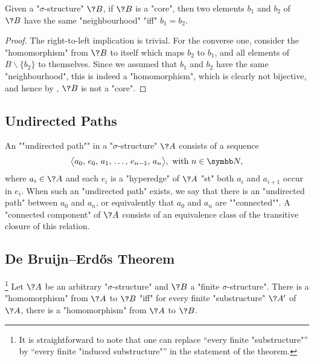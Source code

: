 \begin{proposition}
	\AP\label{prop:neighbourhood-core}
	Given a "$\sigma$-structure" $\?B$, if $\?B$ is a "core", then
	two elements $b_1$ and $b_2$ of $\?B$ have the same "neighbourhood" "iff" $b_1 = b_2$.
\end{proposition}

\begin{proof}
	The right-to-left implication is trivial.
	For the converse one, consider the "homomorphism" from $\?B$ to itself
	which maps $b_2$ to $b_1$, and all elements of $B \smallsetminus \{b_2\}$
	to themselves. Since we assumed that $b_1$ and $b_2$ have the same "neighbourhood",
	this is indeed a "homomorphism", which is clearly not bijective, and
	hence by , $\?B$ is not a "core".
\end{proof}

\subsection{Undirected Paths}

An \AP""undirected path"" in a "$\sigma$-structure" $\?A$ consists of a sequence
\[\big\langle a_0,\, e_0,\, a_1,\, \hdots,\, e_{n-1},\, a_n\big\rangle, \text{ with } n \in \N,\]
where $a_i \in \?A$ and each $e_i$ is a "hyperedge" of $\?A$ "st" both
$a_i$ and $a_{i+1}$ occur in $e_i$. When such an "undirected path" exists, we say that
there is an "undirected path" between $a_0$ and $a_n$, or equivalently
that $a_0$ and $a_n$ are \AP""connected"". A \AP"connected component" of $\?A$ consists of an equivalence class of the 
transitive closure of this relation.

\subsection{De Bruijn–Erdős Theorem}

\AP\begin{proposition}
	\!\footnote{It is straightforward to note that
	one can replace ``every finite "substructure"'' by
	``every finite "induced substructure"'' in the statement of the theorem.}%
	\AP\label{prop:de-bruijn-erdos}
	Let $\?A$ be an arbitrary "$\sigma$-structure" and $\?B$ a "finite $\sigma$-structure".
	There is a "homomorphism" from $\?A$ to $\?B$ "iff" for every finite "substructure" $\?A'$
	of $\?A$, there is a "homomorphism" from $\?A$ to $\?B$.
\end{proposition}

